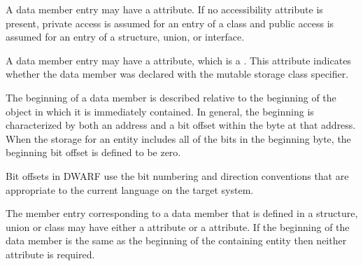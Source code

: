 A data member entry may 
have a 
\DWATaccessibility{}
attribute. If no accessibility attribute is present, private
access is assumed for an entry of a class and public access
is assumed for an entry of a structure, union, or interface.

A data member 
\hypertarget{chap:DWATmutablemutablepropertyofmemberdata}{}
entry 
may 
have a \DWATmutable{} attribute,
which is a . 
This attribute indicates whether the data
member was declared with the mutable storage class specifier.

The beginning of a data member 
is described relative to
the beginning of the object in which it is immediately
contained. In general, the beginning is characterized by
both an address and a bit offset within the byte at that
address. When the storage for an entity includes all of
the bits in the beginning byte, the beginning bit offset is
defined to be zero.

Bit offsets in DWARF use the bit numbering and direction
conventions that are appropriate to the current language on
the target system.

The member entry 
corresponding to a data member that is
\hypertarget{chap:DWATdatabitoffsetdatamemberbitlocation}{}
defined 
\hypertarget{chap:DWATdatamemberlocationdatamemberlocation}{}
in a structure, union or class may have either
a
\DWATdatamemberlocation{} attribute or a
\DWATdatabitoffset{}
attribute. If the beginning of the data member is the same as
the beginning of the containing entity then neither attribute
is required.

